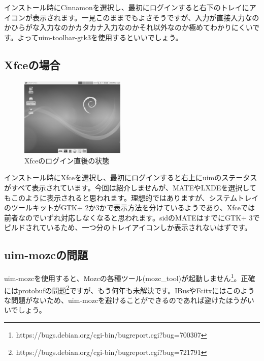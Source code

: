 \documentclass[mingoth,a4paper]{jsarticle}
\begin{document}
インストール時にCinnamonを選択し、最初にログインすると右下のトレイにアイコンが表示されます。一見このままでもよさそうですが、入力が直接入力なのかひらがな入力なのかカタカナ入力なのかそれ以外なのか極めてわかりにくいです。よってuim-toolbar-gtk3を使用するといいでしょう。

\subsection{Xfceの場合}
\begin{figure}
    \begin{center}
        \includegraphics[width=5cm]{image201708/xfce_gray.png}
        \caption{Xfceのログイン直後の状態}
    \end{center}
\end{figure}

インストール時にXfceを選択し、最初にログインすると右上にuimのステータスがすべて表示されています。今回は紹介しませんが、MATEやLXDEを選択してもこのように表示されると思われます。理想的ではありますが、システムトレイのツールキットがGTK+
2か3かで表示方法を分けているようであり、Xfceでは前者なのでいずれ対応しなくなると思われます。sidのMATEはすでにGTK+
3でビルドされているため、一つ分のトレイアイコンしか表示されないはずです。

\clearpage

\subsection{uim-mozcの問題}

uim-mozcを使用すると、Mozcの各種ツール(mozc\_tool)が起動しません\footnote{https://bugs.debian.org/cgi-bin/bugreport.cgi?bug=700307}。正確にはprotobufの問題\footnote{https://bugs.debian.org/cgi-bin/bugreport.cgi?bug=721791}ですが、もう何年も未解決です。IBusやFcitxにはこのような問題がないため、uim-mozcを避けることができるのであれば避けたほうがいいでしょう。
\end{document}

